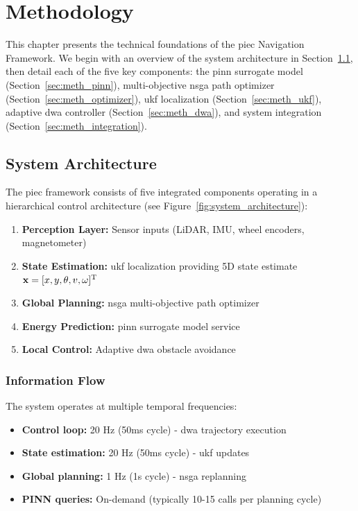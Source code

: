 \chapter{Methodology}
\label{ch:methodology}

This chapter presents the technical foundations of the \acrshort{piec} Navigation Framework. We begin with an overview of the system architecture in Section~\ref{sec:meth_architecture}, then detail each of the five key components: the \acrshort{pinn} surrogate model (Section~\ref{sec:meth_pinn}), multi-objective \acrshort{nsga} path optimizer (Section~\ref{sec:meth_optimizer}), \acrshort{ukf} localization (Section~\ref{sec:meth_ukf}), adaptive \acrshort{dwa} controller (Section~\ref{sec:meth_dwa}), and system integration (Section~\ref{sec:meth_integration}).

\section{System Architecture}
\label{sec:meth_architecture}

The \acrshort{piec} framework consists of five integrated components operating in a hierarchical control architecture (see Figure~\ref{fig:system_architecture}):

\begin{enumerate}
    \item \textbf{Perception Layer:} Sensor inputs (LiDAR, IMU, wheel encoders, magnetometer)
    \item \textbf{State Estimation:} \acrshort{ukf} localization providing 5D state estimate $\mathbf{x} = [x, y, \theta, v, \omega]^\mathrm{T}$
    \item \textbf{Global Planning:} \acrshort{nsga} multi-objective path optimizer
    \item \textbf{Energy Prediction:} \acrshort{pinn} surrogate model service
    \item \textbf{Local Control:} Adaptive \acrshort{dwa} obstacle avoidance
\end{enumerate}

\subsection{Information Flow}

The system operates at multiple temporal frequencies:
\begin{itemize}
    \item \textbf{Control loop:} 20 Hz (50ms cycle) - \acrshort{dwa} trajectory execution
    \item \textbf{State estimation:} 20 Hz (50ms cycle) - \acrshort{ukf} updates
    \item \textbf{Global planning:} 1 Hz (1s cycle) - \acrshort{nsga} replanning
    \item \textbf{PINN queries:} On-demand (typically 10-15 calls per planning cycle)
\end{itemize}

